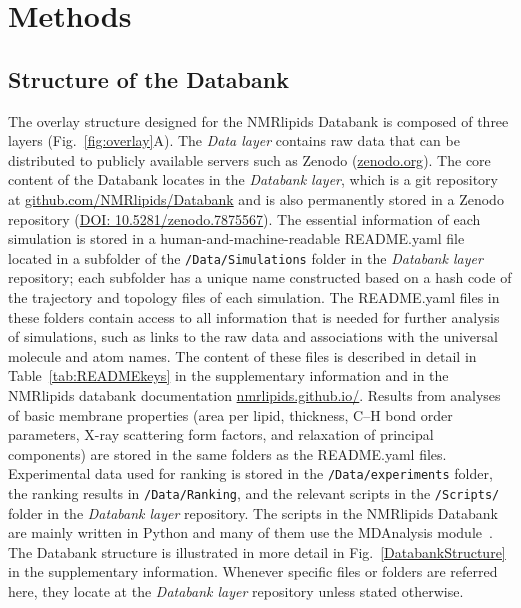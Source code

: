 \documentclass[fleqn,10pt]{wlscirep}
\begin{document}
\newpage

\section{Methods}


\subsection{Structure of the Databank}
The overlay structure designed for the NMRlipids Databank is composed of three layers (Fig.~\ref{fig:overlay}A). The {\it Data layer} contains raw data that can be distributed to publicly available servers such as Zenodo (\href{https://www.zenodo.org/}{zenodo.org}). The core content of the Databank locates in the {\it Databank layer}, which is a git repository at \href{https://github.com/NMRlipids/Databank/}{github.com/NMRlipids/Databank} and is also permanently stored in a Zenodo repository (\href{https://doi.org/10.5281/zenodo.7875567}{DOI: 10.5281/zenodo.7875567}). The essential information of each simulation is stored in a human-and-machine-readable README.yaml file located in a subfolder of the \texttt{/Data/Simulations} folder in the {\it Databank layer} repository; each subfolder has a unique name constructed based on a hash code of the trajectory and topology files of each simulation. The README.yaml files in these folders contain access to all information that is needed for further analysis of simulations, such as links to the raw data and associations with the universal molecule and atom names. The content of these files is described in detail in Table~\ref{tab:READMEkeys} in the supplementary information and in the NMRlipids databank documentation \href{https://nmrlipids.github.io/}{nmrlipids.github.io/}. Results from analyses of basic membrane properties (area per lipid, thickness, C--H bond order parameters, X-ray scattering form factors, and relaxation of principal components) are stored in the same folders as the README.yaml files. Experimental data used for ranking is stored in the \texttt{/Data/experiments} folder, the ranking results in \texttt{/Data/Ranking}, and the relevant scripts in the \texttt{/Scripts/} folder in the {\it Databank layer} repository. The scripts in the NMRlipids Databank are mainly written in Python and many of them use the MDAnalysis module~\cite{gowers2019mdanalysis,michaud2011mdanalysis}. The Databank structure is illustrated in more detail in Fig.~\ref{DatabankStructure} in the supplementary information. Whenever specific files or folders are referred here, they locate at the {\it Databank layer} repository unless stated otherwise. 
\end{document}
